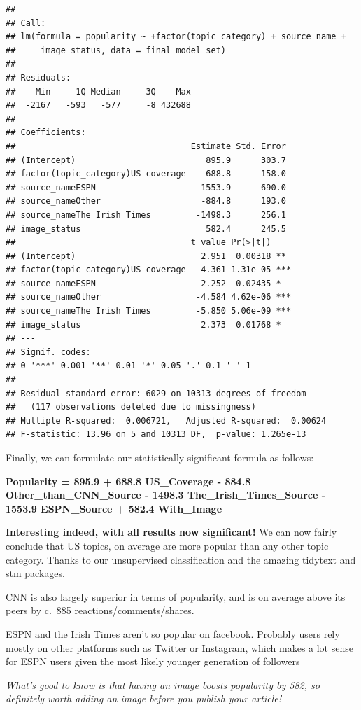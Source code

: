 \documentclass[
]{article}
\begin{document}
\begin{verbatim}
## 
## Call:
## lm(formula = popularity ~ +factor(topic_category) + source_name + 
##     image_status, data = final_model_set)
## 
## Residuals:
##    Min     1Q Median     3Q    Max 
##  -2167   -593   -577     -8 432688 
## 
## Coefficients:
##                                   Estimate Std. Error
## (Intercept)                          895.9      303.7
## factor(topic_category)US coverage    688.8      158.0
## source_nameESPN                    -1553.9      690.0
## source_nameOther                    -884.8      193.0
## source_nameThe Irish Times         -1498.3      256.1
## image_status                         582.4      245.5
##                                   t value Pr(>|t|)    
## (Intercept)                         2.951  0.00318 ** 
## factor(topic_category)US coverage   4.361 1.31e-05 ***
## source_nameESPN                    -2.252  0.02435 *  
## source_nameOther                   -4.584 4.62e-06 ***
## source_nameThe Irish Times         -5.850 5.06e-09 ***
## image_status                        2.373  0.01768 *  
## ---
## Signif. codes:  
## 0 '***' 0.001 '**' 0.01 '*' 0.05 '.' 0.1 ' ' 1
## 
## Residual standard error: 6029 on 10313 degrees of freedom
##   (117 observations deleted due to missingness)
## Multiple R-squared:  0.006721,   Adjusted R-squared:  0.00624 
## F-statistic: 13.96 on 5 and 10313 DF,  p-value: 1.265e-13
\end{verbatim}

Finally, we can formulate our statistically significant formula as
follows:

\textbf{Popularity = 895.9 + 688.8 US\_Coverage - 884.8
Other\_than\_CNN\_Source - 1498.3 The\_Irish\_Times\_Source - 1553.9
ESPN\_Source + 582.4 With\_Image}

\textbf{Interesting indeed, with all results now significant!} We can
now fairly conclude that US topics, on average are more popular than any
other topic category. Thanks to our unsupervised classification and the
amazing tidytext and stm packages.

CNN is also largely superior in terms of popularity, and is on average
above its peers by c.~885 reactions/comments/shares.

ESPN and the Irish Times aren't so popular on facebook. Probably users
rely mostly on other platforms such as Twitter or Instagram, which makes
a lot sense for ESPN users given the most likely younger generation of
followers

\emph{What's good to know is that having an image boosts popularity by
582, so definitely worth adding an image before you publish your
article!}
\end{document}
